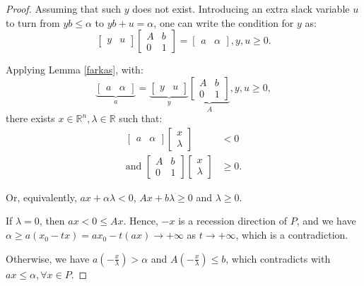 \begin{proof}
  Assuming that such \( y \) does not exist. Introducing an extra slack variable
  \( u \) to turn from \( yb \le \alpha \) to \( yb + u = \alpha \), one can
  write the condition for \( y \) as:
  \[
    \begin{bmatrix} y & u \end{bmatrix} \begin{bmatrix} A & b \\ 0 & 1
    \end{bmatrix}  = \begin{bmatrix} a & \alpha \end{bmatrix}, y, u \ge 0
  .\] 

  Applying Lemma \ref{farkas}, with:
  \[
    \underbrace{\begin{bmatrix} a & \alpha \end{bmatrix} }_{a} =
    \underbrace{\begin{bmatrix} y & u \end{bmatrix}}_{y}
    \underbrace{\begin{bmatrix} A & b \\ 0 & 1
      \end{bmatrix}}_{A}, y, u \ge 0
  ,\] there exists \( x \in \mathbb{R}^{n}, \lambda \in \mathbb{R} \) such that:
  \begin{align*}
    \begin{bmatrix} a & \alpha \end{bmatrix} \begin{bmatrix} x \\ \lambda
  \end{bmatrix} &< 0\\ \text{and }
\begin{bmatrix} A & b \\ 0 & 1
  \end{bmatrix} \begin{bmatrix} x \\ \lambda \end{bmatrix} &\ge 0
  .\end{align*}

  Or, equivalently, \( ax + \alpha\lambda < 0 \), \( Ax + b\lambda \ge 0 \) and
  \( \lambda \ge 0 \).

  If \( \lambda = 0 \), then \( ax < 0 \le Ax \). Hence, \( -x \) is a recession
  direction of \( P \), and we have \( \alpha \ge  a(x_{0} - tx) = ax_{0} -
  t(ax) \to +\infty \) as \( t \to +\infty \), which is a contradiction.

  Otherwise, we have \( a \left( -\frac{x}{\lambda} \right)  > \alpha \) and \( A
  \left( -\frac{x}{\lambda} \right)  \le b \), which contradicts with \( ax \le
  \alpha, \forall x \in P\).
\end{proof}

